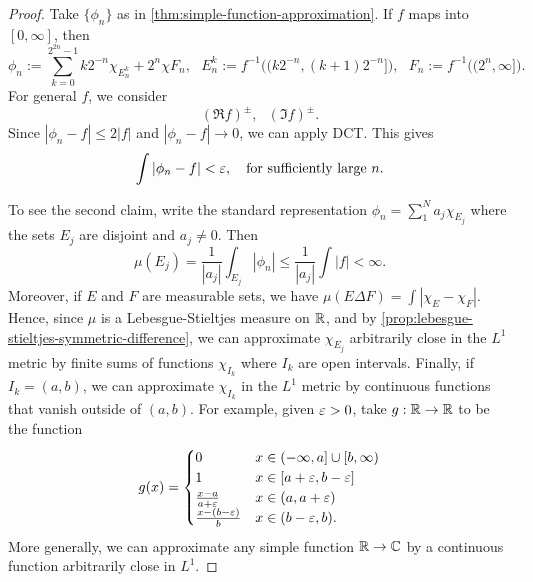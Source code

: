 \documentclass[12pt]{article} %
\begin{document}
\begin{proof}
    Take $\{\phi_n\}$ as in \cref{thm:simple-function-approximation}. If $f$ maps into $[0, \infty]$, then \[\phi_n := \sum_{k = 0}^{2^{2n} - 1} k 2^{-n} \chi_{E_n^k} + 2^n \chi F_n, \ \ \ E_n^k := f^{-1}\Big((k2^{-n}, (k+1)2^{-n}]\Big), \ \ \ F_n := f^{-1}\Big( (2^n, \infty]\Big).\] For general $f$, we consider \[(\Re f)^{\pm}, \ \ \ (\Im f)^{\pm}.\] Since $|\phi_n - f| \leq 2|f|$ and $|\phi_n - f| \to 0$, we can apply DCT. This gives \[\int |\phi_n - f| < \varepsilon, \ \ \ \text{for sufficiently large $n$}.\]

    To see the second claim, write the standard representation $\phi_n = \sum_1^N a_j \chi_{E_j}$ where the sets $E_j$ are disjoint and $a_j \neq 0$. Then \[\mu(E_j) = \frac{1}{|a_j|} \int_{E_j}|\phi_n| \leq \frac{1}{|a_j|} \int |f| < \infty.\] Moreover, if $E$ and $F$ are measurable sets, we have $\mu(E \Delta F) = \int |\chi_E - \chi_F|$. Hence, since $\mu$ is a Lebesgue-Stieltjes measure on $\mathbb{R}$, and by \cref{prop:lebesgue-stieltjes-symmetric-difference}, we can approximate $\chi_{E_j}$ arbitrarily close in the $L^1$ metric by finite sums of functions $\chi_{I_k}$ where $I_k$ are open intervals. Finally, if $I_k = (a, b)$, we can approximate $\chi_{I_k}$ in the $L^1$ metric by continuous functions that vanish outside of $(a, b)$. For example, given $\varepsilon > 0$, take $g : \mathbb{R} \to \mathbb{R}$ to be the function \[g(x) = \begin{cases}
        0 &x \in (-\infty, a] \cup [b, \infty)\\
        1 &x \in [a + \varepsilon, b - \varepsilon]\\
        \frac{x-a}{a+\varepsilon} &x \in (a, a+ \varepsilon)\\
        \frac{x- (b - \varepsilon)}{b} &x \in (b-\varepsilon, b).
    \end{cases}\]
    More generally, we can approximate any simple function $\mathbb{R} \to \mathbb{C}$ by a continuous function arbitrarily close in $L^1$.
\end{proof}

\pagebreak

\small



\end{document}
